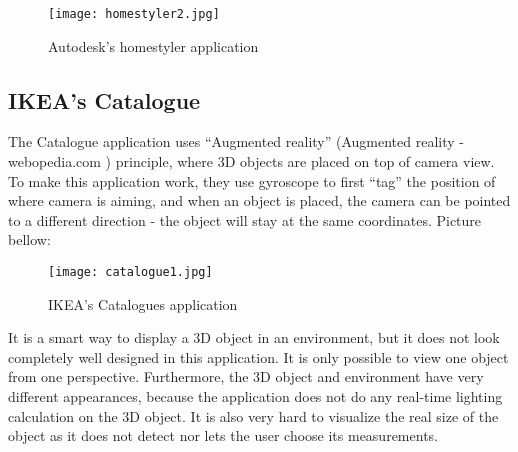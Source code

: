 \begin{figure}[H]
\centering
\texttt{[image: homestyler2.jpg]}
\caption{Autodesk's homestyler application}
\end{figure}

\subsection{IKEA’s Catalogue}

The Catalogue application uses “Augmented reality” (Augmented reality - webopedia.com ) principle, where 3D objects are placed on top of camera view. To make this application work, they use gyroscope to first “tag” the position of where camera is aiming, and when an object is placed, the camera can be pointed to a different direction - the object will stay at the same coordinates. Picture bellow:

\begin{figure}[H]
\centering
\texttt{[image: catalogue1.jpg]}
\caption{IKEA's Catalogues application}
\end{figure}

It is a smart way to display a 3D object in an environment, but it does not look completely well designed in this application. It is only possible to view one object from one perspective. Furthermore, the 3D object and environment have very different appearances, because the application does not do any real-time lighting calculation on the 3D object. It is also very hard to visualize the real size of the object as it does not detect nor lets the user choose its measurements.
